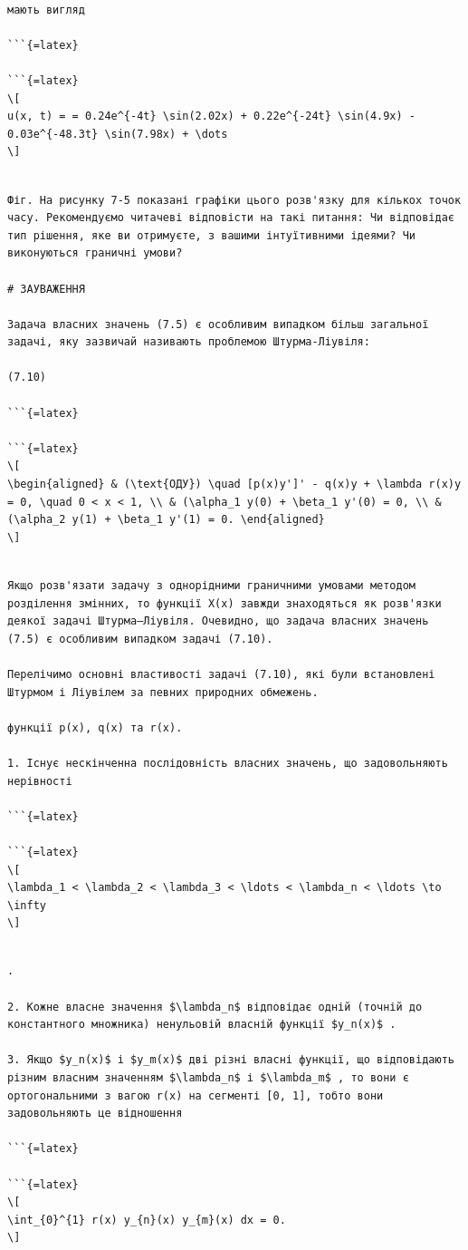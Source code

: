 \documentclass[
]{article}
\begin{document}
\begin{verbatim}

мають вигляд

```{=latex}

```{=latex}
\[
u(x, t) = = 0.24e^{-4t} \sin(2.02x) + 0.22e^{-24t} \sin(4.9x) - 0.03e^{-48.3t} \sin(7.98x) + \dots
\]
\end{verbatim}

\begin{verbatim}

Фіг. На рисунку 7-5 показані графіки цього розв'язку для кількох точок часу. Рекомендуємо читачеві відповісти на такі питання: Чи відповідає тип рішення, яке ви отримуєте, з вашими інтуїтивними ідеями? Чи виконуються граничні умови?

# ЗАУВАЖЕННЯ

Задача власних значень (7.5) є особливим випадком більш загальної задачі, яку зазвичай називають проблемою Штурма-Ліувіля:

(7.10)

```{=latex}

```{=latex}
\[
\begin{aligned} & (\text{ОДУ}) \quad [p(x)y']' - q(x)y + \lambda r(x)y = 0, \quad 0 < x < 1, \\ & (\alpha_1 y(0) + \beta_1 y'(0) = 0, \\ & (\alpha_2 y(1) + \beta_1 y'(1) = 0. \end{aligned}
\]
\end{verbatim}

\begin{verbatim}

Якщо розв'язати задачу з однорідними граничними умовами методом розділення змінних, то функції X(x) завжди знаходяться як розв'язки деякої задачі Штурма–Ліувіля. Очевидно, що задача власних значень (7.5) є особливим випадком задачі (7.10).

Перелічимо основні властивості задачі (7.10), які були встановлені Штурмом і Ліувілем за певних природних обмежень.

функції p(x), q(x) та r(x).

1. Існує нескінченна послідовність власних значень, що задовольняють нерівності

```{=latex}

```{=latex}
\[
\lambda_1 < \lambda_2 < \lambda_3 < \ldots < \lambda_n < \ldots \to \infty
\]
\end{verbatim}

\begin{verbatim}

.

2. Кожне власне значення $\lambda_n$ відповідає одній (точній до константного множника) ненульовій власній функції $y_n(x)$ .

3. Якщо $y_n(x)$ і $y_m(x)$ дві різні власні функції, що відповідають різним власним значенням $\lambda_n$ і $\lambda_m$ , то вони є ортогональними з вагою r(x) на сегменті [0, 1], тобто вони задовольняють це відношення

```{=latex}

```{=latex}
\[
\int_{0}^{1} r(x) y_{n}(x) y_{m}(x) dx = 0.
\]
\end{verbatim}
\end{document}
